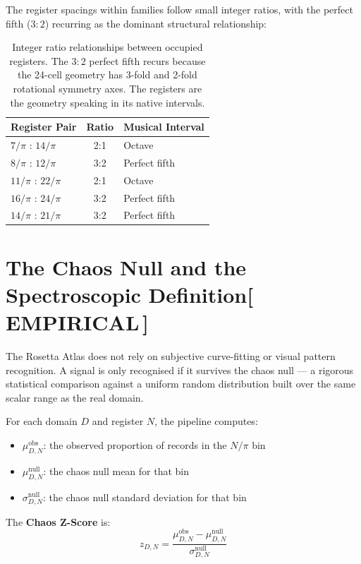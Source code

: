 \documentclass[12pt,oneside]{book}
\newcommand{\EmpiricalTag}{\;\colorbox{empiricaltag!15}{\textcolor{empiricaltag}{\footnotesize\bfseries [\,EMPIRICAL\,]}}}
\begin{document}
The register spacings within families follow small integer ratios, with the perfect
fifth ($3:2$) recurring as the dominant structural relationship:

\begin{table}[H]
\centering
\renewcommand{\arraystretch}{1.3}
\begin{tabular}{|l|c|l|}
\hline
\rowcolor{blue!8}
\textbf{Register Pair} & \textbf{Ratio} & \textbf{Musical Interval} \\
\hline\hline
$7/\pi$ \;:\; $14/\pi$ & 2:1 & Octave \\
$8/\pi$ \;:\; $12/\pi$ & 3:2 & Perfect fifth \\
$11/\pi$ \;:\; $22/\pi$ & 2:1 & Octave \\
$16/\pi$ \;:\; $24/\pi$ & 3:2 & Perfect fifth \\
$14/\pi$ \;:\; $21/\pi$ & 3:2 & Perfect fifth \\
\hline
\end{tabular}
\caption{Integer ratio relationships between occupied registers. The $3:2$ perfect
fifth recurs because the 24-cell geometry has 3-fold and 2-fold rotational symmetry
axes. The registers are the geometry speaking in its native intervals.}
\label{tab:perfect_fifth}
\end{table}

\section{The Chaos Null and the Spectroscopic Definition\EmpiricalTag}

The Rosetta Atlas does not rely on subjective curve-fitting or visual pattern
recognition. A signal is only recognised if it survives the chaos null — a rigorous
statistical comparison against a uniform random distribution built over the same
scalar range as the real domain.

For each domain $D$ and register $N$, the pipeline computes:

\begin{itemize}
\item $\mu_{D,N}^{\text{obs}}$: the observed proportion of records in the $N/\pi$ bin
\item $\mu_{D,N}^{\text{null}}$: the chaos null mean for that bin
\item $\sigma_{D,N}^{\text{null}}$: the chaos null standard deviation for that bin
\end{itemize}

The \textbf{Chaos Z-Score} is:
\begin{equation}
z_{D,N} = \frac{\mu_{D,N}^{\text{obs}} - \mu_{D,N}^{\text{null}}}{\sigma_{D,N}^{\text{null}}}
\label{eq:chaos_z}
\end{equation}
\end{document}
